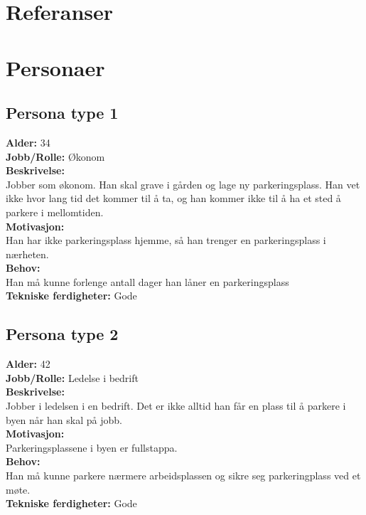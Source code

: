 \documentclass[12pt]{article}
\begin{document}
\section{Referanser}

\section{Personaer}

    \subsection{Persona type 1}
    \textbf{Alder:} 34 \\\textbf{Jobb/Rolle:} Økonom\\\textbf{Beskrivelse:}\\Jobber som økonom. Han skal grave i gården og lage ny parkeringsplass. Han vet ikke hvor lang tid det kommer til å ta, og han kommer ikke til å ha et sted å parkere i mellomtiden.\\\textbf{Motivasjon:}\\Han har ikke parkeringsplass hjemme, så han trenger en parkeringsplass i nærheten.\\\textbf{Behov:}\\Han må kunne forlenge antall dager han låner en parkeringsplass\\\textbf{Tekniske ferdigheter:} Gode

    \subsection{Persona type 2}
    \textbf{Alder:} 42\\\textbf{Jobb/Rolle:} Ledelse i bedrift\\\textbf{Beskrivelse:}\\Jobber i ledelsen i en bedrift. Det er ikke alltid han får en plass til å parkere i byen når han skal på jobb.\\\textbf{Motivasjon:}\\ Parkeringsplassene i byen er fullstappa.\\\textbf{Behov:}\\Han må kunne parkere nærmere arbeidsplassen og sikre seg parkeringplass ved et møte.\\\textbf{Tekniske ferdigheter:} Gode
\end{document}
